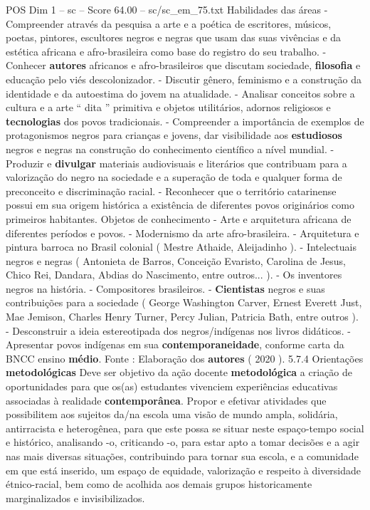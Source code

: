 \begin{textsample}{POS Dim 1 – sc – Score 64.00 – sc/sc\_em\_75.txt}
Habilidades das áreas - Compreender através da pesquisa a arte e a poética de escritores, músicos, poetas, pintores, escultores negros e negras que usam das suas vivências e da estética africana e afro-brasileira como base do registro do seu trabalho. - Conhecer \textbf{autores} africanos e afro-brasileiros que discutam sociedade, \textbf{filosofia} e educação pelo viés descolonizador. - Discutir gênero, feminismo e a construção da identidade e da autoestima do jovem na atualidade. - Analisar conceitos sobre a cultura e a arte “ dita ” primitiva e objetos utilitários, adornos religiosos e \textbf{tecnologias} dos povos tradicionais. - Compreender a importância de exemplos de protagonismos negros para crianças e jovens, dar visibilidade aos \textbf{estudiosos} negros e negras na construção do conhecimento científico a nível mundial. - Produzir e \textbf{divulgar} materiais audiovisuais e literários que contribuam para a valorização do negro na sociedade e a superação de toda e qualquer forma de preconceito e discriminação racial. - Reconhecer que o território catarinense possui em sua origem histórica a existência de diferentes povos originários como primeiros habitantes.
Objetos de conhecimento - Arte e arquitetura africana de diferentes períodos e povos. - Modernismo da arte afro-brasileira. - Arquitetura e pintura barroca no Brasil colonial ( Mestre Athaide, Aleijadinho ). - Intelectuais negros e negras ( Antonieta de Barros, Conceição Evaristo, Carolina de Jesus, Chico Rei, Dandara, Abdias do Nascimento, entre outros... ). - Os inventores negros na história. - Compositores brasileiros. - \textbf{Cientistas} negros e suas contribuições para a sociedade ( George Washington Carver, Ernest Everett Just, Mae Jemison, Charles Henry Turner, Percy Julian, Patricia Bath, entre outros ). - Desconstruir a ideia estereotipada dos negros/indígenas nos livros didáticos. - Apresentar povos indígenas em sua \textbf{contemporaneidade}, conforme carta da BNCC ensino \textbf{médio}.
Fonte : Elaboração dos \textbf{autores} ( 2020 ). 5.7.4 Orientações \textbf{metodológicas} Deve ser objetivo da ação docente \textbf{metodológica} a criação de oportunidades para que os(as) estudantes vivenciem experiências educativas associadas à realidade \textbf{contemporânea}.
Propor e efetivar atividades que possibilitem aos sujeitos da/na escola uma visão de mundo ampla, solidária, antirracista e heterogênea, para que este possa se situar neste espaço-tempo social e histórico, analisando -o, criticando -o, para estar apto a tomar decisões e a agir nas mais diversas situações, contribuindo para tornar sua escola, e a comunidade em que está inserido, um espaço de equidade, valorização e respeito à diversidade étnico-racial, bem como de acolhida aos demais grupos historicamente marginalizados e invisibilizados.

\end{textsample}
